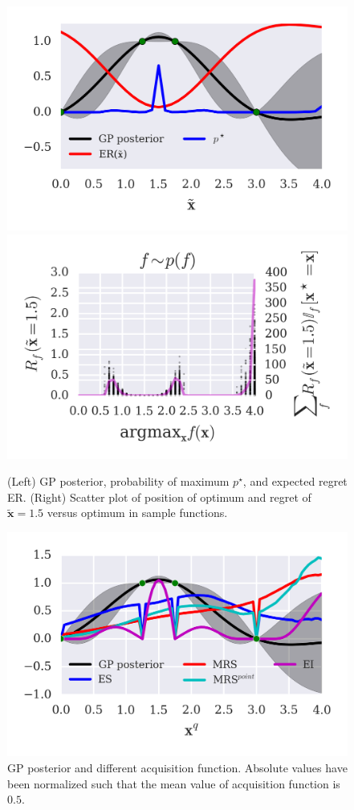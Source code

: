 \begin{block}{}
\vspace*{1cm}

\begin{figure}
\centering
\includegraphics[width=0.48\columnwidth]{../pics/regret_illustration_2}
\includegraphics[width=0.48\columnwidth]{../pics/regret_scatter}
\caption{(Left) GP posterior, probability of maximum $p^\star$, and expected regret ER. (Right) Scatter plot of position of optimum and regret of $\mathbf{\tilde x} = 1.5$ versus optimum in sample functions.}
\label{fig:MRS_illustration}
\end{figure}

\begin{figure}
\centering
\includegraphics[width=0.48\columnwidth]{../pics/acq_comparison}
\caption{GP posterior and different acquisition function. Absolute values have been normalized such that the mean value of acquisition function is $0.5$.}
\label{fig:MRS_illustration}
\end{figure}
\end{block}
